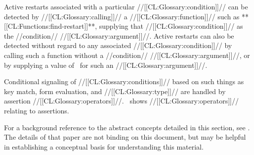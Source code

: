 Active restarts associated with a particular //[[CL:Glossary:condition]]// can be detected by //[[CL:Glossary:calling]]// a //[[CL:Glossary:function]]// such as **[[CL:Functions:find-restart]]**, supplying that //[[CL:Glossary:condition]]// as the //condition// //[[CL:Glossary:argument]]//. Active restarts can also be detected without regard to any associated //[[CL:Glossary:condition]]// by calling such a function without a //condition// //[[CL:Glossary:argument]]//, or by supplying a value of \nil\ for such an //[[CL:Glossary:argument]]//.

\endsubsubsubsection%

\endsubsubsection%
  Conditional signaling of //[[CL:Glossary:conditions]]// based on such things as key match, form evaluation, and //[[CL:Glossary:type]]// are handled by assertion //[[CL:Glossary:operators]]//. \Thenextfigure\ shows //[[CL:Glossary:operators]]// relating to assertions.

  \endSubsection%


For a background reference to the abstract concepts detailed in this section, see \CondSysPaper.  The details of that paper are not binding on this document, but may be helpful in establishing a conceptual basis for understanding this material.

\endsubsection%

